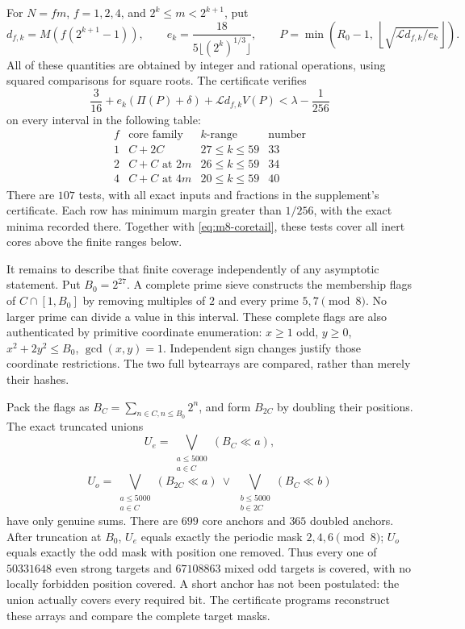 For \(N=fm\), \(f=1,2,4\), and \(2^k\le m<2^{k+1}\), put
\[
 d_{f,k}=M(f(2^{k+1}-1)),\qquad
 e_k=\frac{18}{5\lfloor(2^k)^{1/3}\rfloor},\qquad
 P=\min\left(R_0-1,\
          \left\lfloor\sqrt{\mathcal Ld_{f,k}/e_k}\right\rfloor\right).
\]
All of these quantities are obtained by integer and rational
operations, using squared comparisons for square roots.
The certificate verifies
\begin{equation}
 \frac3{16}+e_k(\Pi(P)+\delta)
                      +\mathcal Ld_{f,k}V(P)
                            <\lambda-\frac1{256}              \label{eq:m8-intervalcert}
\end{equation}
on every interval in the following table:
\[
\begin{array}{c|c|c|c}
 f&\text{core family}&k\text{-range}&\text{number}\\\hline
 1&C+2C&27\le k\le59&33\\
 2&C+C\text{ at }2m&26\le k\le59&34\\
 4&C+C\text{ at }4m&20\le k\le59&40
\end{array}
\]
There are \(107\) tests, with all exact inputs and fractions in
the supplement's certificate. Each row has minimum margin greater than
\(1/256\), with the exact minima recorded there.
Together with \eqref{eq:m8-coretail}, these tests cover all
inert cores above the finite ranges below.

It remains to describe that finite coverage independently of
any asymptotic statement. Put \(B_0=2^{27}\).
A complete prime sieve constructs the membership flags of
\(C\cap[1,B_0]\) by removing multiples of \(2\) and every
prime \(5,7\pmod8\). No larger prime can divide a value in this
interval. These complete flags are also authenticated by
primitive coordinate enumeration:
\(x\ge1\) odd, \(y\ge0\),
\(x^2+2y^2\le B_0\), \(\gcd(x,y)=1\).
Independent sign changes justify those coordinate restrictions.
The two full bytearrays are compared, rather than merely their
hashes.

Pack the flags as \(B_C=\sum_{n\in C,n\le B_0}2^n\), and form
\(B_{2C}\) by doubling their positions. The exact truncated unions
\[
 U_e=\bigvee_{\substack{a\le5000\\a\in C}}(B_C\ll a),
\]
\[
 U_o=\bigvee_{\substack{a\le5000\\a\in C}}(B_{2C}\ll a)
         \ \vee\
          \bigvee_{\substack{b\le5000\\b\in2C}}(B_C\ll b)
\]
have only genuine sums. There are \(699\) core anchors and
\(365\) doubled anchors.
After truncation at \(B_0\), \(U_e\) equals exactly the periodic
mask \(2,4,6\pmod8\); \(U_o\) equals exactly the odd mask with
position one removed. Thus every one of \(50331648\) even
strong targets and \(67108863\) mixed odd targets is covered,
with no locally forbidden position covered. A short anchor
has not been postulated: the union actually covers every
required bit. The certificate programs reconstruct these arrays
and compare the complete target masks.

